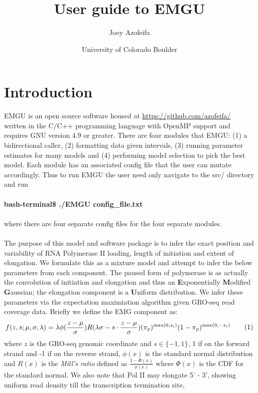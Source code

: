 \documentclass{article}
\title{User guide to EMGU}
\author{Joey Azofeifa}
\date{ University of Colorado Boulder }
\newcommand\numberthis{\addtocounter{equation}{1}\tag{\theequation}}
\theoremstyle{definition}
\begin{document}
 
\maketitle
 
\tableofcontents
 
\section{Introduction}
EMGU is an open source software housed at \url{https://github.com/azofeifa/} written in the C/C++ programming language with OpenMP support and requires GNU version 4.9 or greater. There are four modules that EMGU: (1) a bidirectional caller, (2) formatting data given intervals, (3) running parameter estimates for many models and (4) performing model selection to pick the best model. Each module has an associated config file that the user can mutate accordingly. Thus to run EMGU the user need only navigate to the src/ directory and run
\\
\\
\textbf{bash-terminal\$ ./EMGU config\_file.txt}
\\
\\
where there are four separate config files for the four separate modules. 
\\
\\
The purpose of this model and software package is to infer the exact position and variability of RNA Polymerase II loading, length of initiation and extent of elongation. We formulate this as a mixture model and attempt to infer the below parameters from each component. 
The paused form of polymerase is as actually the convolution of initiation and elongation and thus an \textbf{E}xponentially \textbf{M}odified \textbf{G}aussian; the elongation component is a \textbf{U}niform distribution. We infer these parameters via the expectation maximiation algorithm given GRO-seq read coverage data. Briefly we define the EMG component as:
\begin{displaymath}
\begin{split}
    f(z, s; \mu, \sigma, \lambda)&=  
      	 \lambda\phi(\frac{z-\mu}{\sigma})R(\lambda\sigma - s\cdot\frac{z-\mu}{\sigma})(\pi_p)^{\max(0, s_i)}(1-\pi_p)^{\max(0,-s_i)}\\
\end{split}\numberthis \label{eqn_1}
\end{displaymath}
where $z$ is the GRO-seq genomic coordinate and $s\in\{-1,1\}$, 1 if on the forward strand and -1 if on the reverse strand, $\phi(x)$ is the standard normal distribution and $R(x)$ is the \textit{Mill's ratio} defined as $\frac{1-\Phi(x)}{\phi(x)}$ where $\Phi(x)$ is the CDF for the standard normal. We also note that Pol II may elongate 5' - 3', showing uniform read density till the transcription termination site,  
\end{document}
